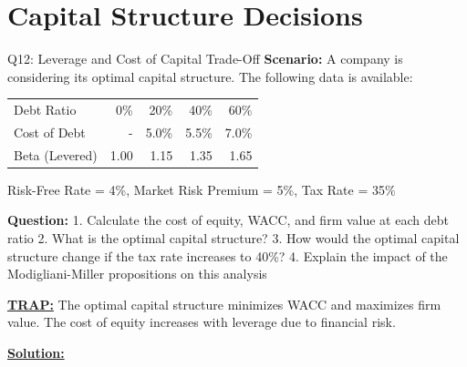 \documentclass{beamer}
\renewcommand{\scriptsize}{\fontsize{6pt}{7pt}\selectfont}
\begin{document}
	
	\section{Capital Structure Decisions}
	
	\begin{frame}{Q12: Leverage and Cost of Capital Trade-Off}
		\scriptsize
		\textbf{Scenario:} A company is considering its optimal capital structure. The following data is available:
		
		\begin{tabular}{lrrrr}
			Debt Ratio & 0\% & 20\% & 40\% & 60\% \\
			Cost of Debt & - & 5.0\% & 5.5\% & 7.0\% \\
			Beta (Levered) & 1.00 & 1.15 & 1.35 & 1.65 \\
		\end{tabular}
		
		Risk-Free Rate = 4\%, Market Risk Premium = 5\%, Tax Rate = 35\%
		
		\textbf{Question:}
		1. Calculate the cost of equity, WACC, and firm value at each debt ratio
		2. What is the optimal capital structure?
		3. How would the optimal capital structure change if the tax rate increases to 40\%?
		4. Explain the impact of the Modigliani-Miller propositions on this analysis
		
		\vspace{2pt}
		\underline{\textbf{TRAP:}} The optimal capital structure minimizes WACC and maximizes firm value. The cost of equity increases with leverage due to financial risk.
		
		\vspace{4pt}
		\underline{\textbf{Solution:}}
	\end{frame}
	
\end{document}
